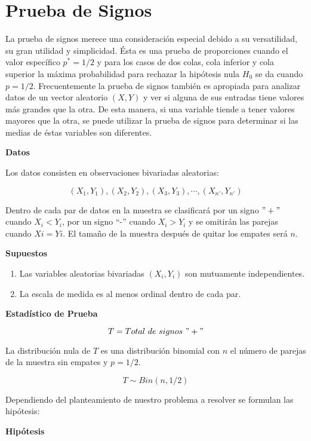 \documentclass[
  a4paper,
  oneside,
  openany]{book}
\begin{document}
\hypertarget{prueba-de-signos}{%
\chapter{Prueba de Signos}\label{prueba-de-signos}}

La prueba de signos merece una consideración especial debido a su versatilidad, su gran utilidad y simplicidad. Ésta es una prueba de proporciones cuando el valor específico \(p^*=1/2\) y para los casos de dos colas, cola inferior y cola superior la máxima probabilidad para rechazar la hipótesis nula \(H_0\) se da cuando \(p = 1/2\). Frecuentemente la prueba de signos también es apropiada para analizar datos de un vector aleatorio \((X,Y)\) y ver si alguna de sus entradas tiene valores más grandes que la otra. De esta manera, si una variable tiende a tener valores mayores que la otra, se puede utilizar la prueba de signos para determinar si las medias de éstas variables son diferentes.

\textbf{Datos}

Los datos consisten en observaciones bivariadas aleatorias:

\[(X_{1},Y_{1}),(X_{2},Y_{2}),(X_{3},Y_{3}),\cdots,(X_{n'},Y_{n'})\]

Dentro de cada par de datos en la muestra se clasificará por un signo \("+"\) cuando \(X_{i} < Y_{i}\), por un signo ``-'' cuando \(X_{i} > Y_{i}\) y se omitirán las parejas cuando \(Xi = Yi\). El tamaño de la muestra después de quitar los empates será \(n\).

\textbf{Supuestos}

\begin{enumerate}
\def\labelenumi{\arabic{enumi})}
\item
  Las variables aleatorias bivariadas \((X_{i},Y_{i})\) son mutuamente independientes.
\item
  La escala de medida es al menos ordinal dentro de cada par.
\end{enumerate}

\textbf{Estadístico de Prueba}

\[T=Total\ de\ signos\ "+"\]

La distribución nula de \(T\) es una distribución binomial con \(n\) el número de parejas de la muestra sin empates y \(p=1/2\).

\[T\sim Bin(n,1/2)\]

Dependiendo del planteamiento de nuestro problema a resolver se formulan las hipótesis:

\textbf{Hipótesis}
\end{document}
